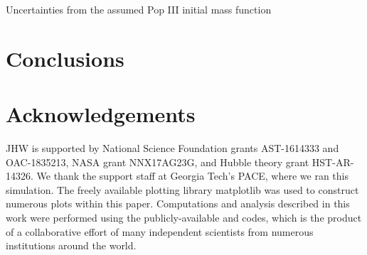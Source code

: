 \documentclass[a4paper,fleqn,usenatbib]{mnras}
\begin{document}
\li Uncertainties from the assumed Pop III initial mass function 

\section{Conclusions}

\section*{Acknowledgements}

JHW is supported by National Science Foundation grants AST-1614333 and OAC-1835213, NASA grant NNX17AG23G, and Hubble theory grant
HST-AR-14326.  We thank the support staff at Georgia Tech's PACE,
where we ran this simulation.  The freely available plotting library
{\sc matplotlib} \citep{matplotlib} was used to construct numerous
plots within this paper. Computations and analysis described in this
work were performed using the publicly-available \enzo{} and \yt{}
codes, which is the product of a collaborative effort of many
independent scientists from numerous institutions around the world.










\appendix



\bsp	%
\label{lastpage}
\end{document}
